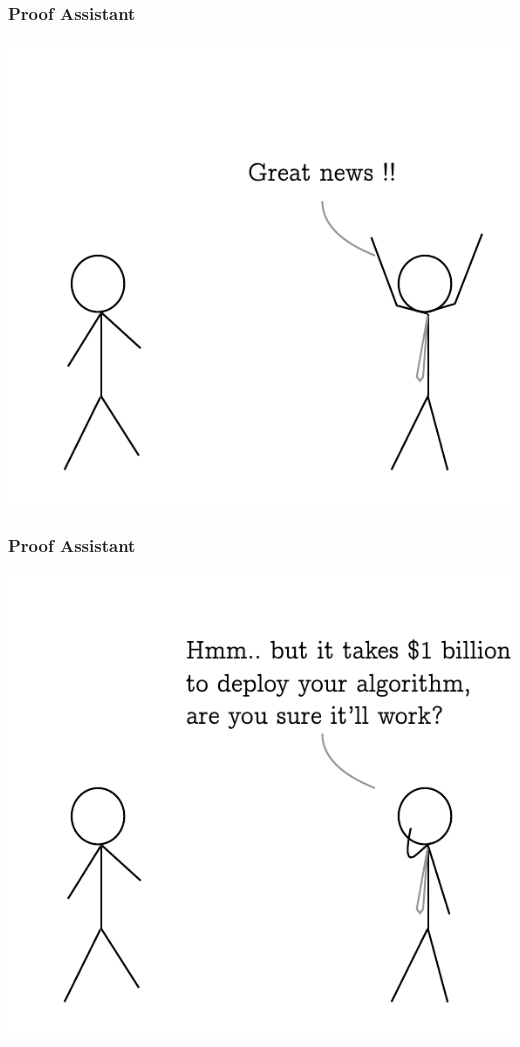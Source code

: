\documentclass{beamer}
\begin{document}
  \begin{frame}
    \frametitle{Proof Assistant}
    \centering
    \includegraphics[scale=0.8]{images/3.pdf}
  \end{frame}
  \begin{frame}
    \frametitle{Proof Assistant}
    \centering
    \includegraphics[scale=0.8]{images/4.pdf}
  \end{frame}
\end{document}
